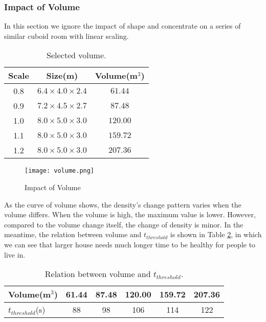 \documentclass{mcmthesis}
\begin{document}
\subsubsection{Impact of Volume}

In this section we ignore the impact of shape and concentrate on a series of similar cuboid room with linear scaling.
\begin{table}[H]
  \begin{center}
    \caption{Selected volume.}
    \label{tab:Not}
    \begin{tabular}{ccc}
      	\toprule
      	Scale & Size(m) & Volume(m$^3$)\\
      	\midrule
        0.8&$6.4\times4.0\times2.4$& $61.44$\\
        0.9&$7.2\times4.5\times2.7$& $87.48$\\
    	1.0&$8.0\times5.0\times3.0$& $120.00$\\
        1.1&$8.0\times5.0\times3.0$& $159.72$\\
        1.2&$8.0\times5.0\times3.0$& $207.36$\\
      	\bottomrule
    \end{tabular}
  \end{center}
\end{table}

\begin{figure}[H]
  \centering
  \texttt{[image: volume.png]}
  \caption{Impact of Volume}
  \label{fig:volume}
\end{figure}

As the curve of volume shows, the density's change pattern varies when the volume differs. When the volume is high, the maximum value is lower. However, compared to the volume change itself, the change of density is minor. In the meantime, the relation between volume and $t_{threshold}$ is shown in Table \ref{tab:RbV}, in which we can see that larger house needs much longer time to be healthy for people to live in.

\begin{table}[H]
  \begin{center}
    \caption{Relation between volume and $t_{threshold}$.}
    \label{tab:RbV}
    \begin{tabular}{lccccc}
      	\toprule
        Volume(m$^3$) & 61.44 & 87.48 & 120.00 & 159.72 & 207.36\\
		\midrule
        $t_{threshold}$(s) & 88 & 98 & 106 & 114 & 122\\
      	\bottomrule
    \end{tabular}
  \end{center}
\end{table}
\end{document}
